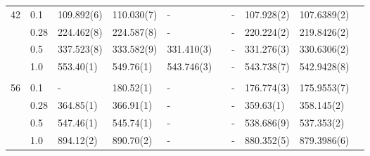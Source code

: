 {\begin{landscape}
\begin{table}
\begin{tabularx}{\hsize}{llR{2.3cm}R{2.3cm}R{2.3cm}R{2.3cm}R{2.3cm}R{2.3cm}R{2.3cm}R{2.1cm}}
		42 & 0.1 & 109.892(6) & 110.030(7) & - & & - &  107.928(2) & 107.6389(2) \\ 
		& 0.28 & 224.462(8) & 224.587(8) & - & & - & 220.224(2) & 219.8426(2) \\
		& 0.5 & 337.523(8) & 333.582(9) & 331.410(3) & & - & 331.276(3) & 330.6306(2) \\
		& 1.0 & 553.40(1) & 549.76(1) & 543.746(3) & & - & 543.738(7) & 542.9428(8) \\ \hdashline \\
		
		56 & 0.1 & - & 180.52(1) & - & & - & 176.774(3) & 175.9553(7) \\ 
		& 0.28 & 364.85(1) & 366.91(1) & - & & - & 359.63(1) & 358.145(2) \\
		& 0.5 & 547.46(1) & 545.74(1) & - & & - & 538.686(9) & 537.353(2) \\
		& 1.0 & 894.12(2) & 890.70(2) & - & & - & 880.352(5) & 879.3986(6) \\ \hline\hline
	\end{tabularx}
\end{table}


\end{landscape}}
